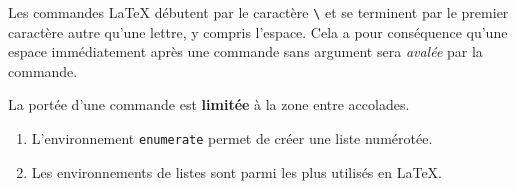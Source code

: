 \documentclass[12pt]{article}
\begin{document}
Les commandes {\LaTeX} débutent par le caractère \verb=\= et se
terminent par le premier caractère autre qu'une lettre, y compris
l'espace. Cela a pour conséquence qu'une espace immédiatement après
une commande sans argument sera \emph{avalée} par la commande.

La portée d'une commande est {\bfseries limitée} à la zone entre accolades.

\begin{enumerate}
\item L'environnement \texttt{enumerate} permet de créer une liste
  numérotée.
\item Les environnements de listes sont parmi les plus utilisés en
  \LaTeX.
\end{enumerate}
\end{document}
